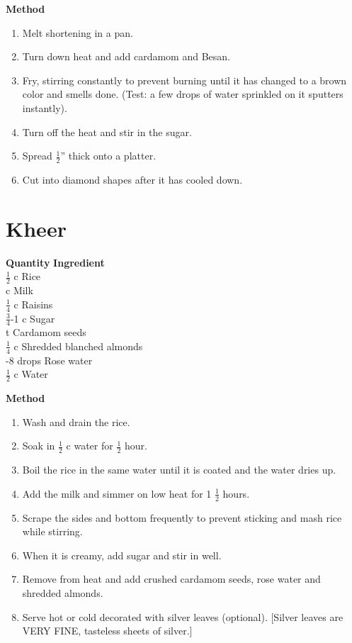 {\bf Method}
\begin{enumerate}
\item Melt shortening in a pan.
\item Turn down heat and add cardamom and Besan.
\item Fry, stirring constantly to prevent burning until it has changed to a brown color
and smells done.  (Test: a few drops of water sprinkled on it
sputters instantly).
\item Turn off the heat and stir in the sugar.
\item Spread $\frac{1}{2}$'' thick onto a platter.
\item Cut into diamond shapes after it has cooled down.
\end{enumerate}


\section{Kheer}

\begin{tabbing}
\hspace{1.0cm}  \={\bf Quantity}   \hspace{3.0cm} \={\bf Ingredient}\\

\>$\frac{1}{2}$ c \>Rice\\
 c \>Milk\\
\>$\frac{1}{4}$ c \>Raisins\\
\>$\frac{3}{4}$-1 c \>Sugar\\
 t \>Cardamom seeds\\
\>$\frac{1}{4}$ c \>Shredded blanched almonds\\
-8 drops \>Rose water\\
\>$\frac{1}{2}$ c \>Water \\
\end{tabbing}

{\bf Method}
\begin{enumerate}
\item Wash and drain the rice.
\item Soak in $\frac{1}{2}$ c water for $\frac{1}{2}$ hour.
\item Boil the rice in the same water until it is coated and the water dries
up.
\item Add the milk and simmer on low heat for 1 $\frac{1}{2}$ hours.
\item Scrape the sides and bottom frequently to prevent sticking and mash rice while
stirring.
\item When it is creamy, add sugar and stir in well.
\item Remove from heat and add crushed cardamom seeds, rose water and shredded
almonds.
\item Serve hot or cold decorated with silver leaves (optional). [Silver
leaves are VERY FINE, tasteless sheets of silver.]
\end{enumerate}


